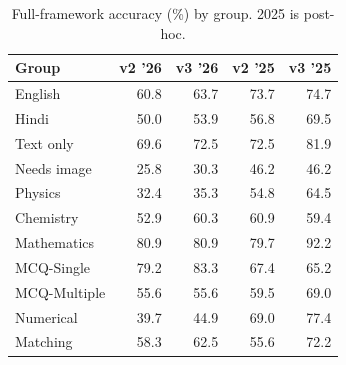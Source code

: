 \begin{table}[!t]
\centering
\footnotesize
\caption{Full-framework accuracy (\%) by group. 2025 is post-hoc.}
\label{tab:bd}
\setlength{\tabcolsep}{3.5pt}
\begin{tabular}{lrrrr}
\toprule
Group & v2 '26 & v3 '26 & v2 '25 & v3 '25 \\
\midrule
English & 60.8 & 63.7 & 73.7 & 74.7 \\
Hindi & 50.0 & 53.9 & 56.8 & 69.5 \\
Text only & 69.6 & 72.5 & 72.5 & 81.9 \\
Needs image & 25.8 & 30.3 & 46.2 & 46.2 \\
Physics & 32.4 & 35.3 & 54.8 & 64.5 \\
Chemistry & 52.9 & 60.3 & 60.9 & 59.4 \\
Mathematics & 80.9 & 80.9 & 79.7 & 92.2 \\
MCQ-Single & 79.2 & 83.3 & 67.4 & 65.2 \\
MCQ-Multiple & 55.6 & 55.6 & 59.5 & 69.0 \\
Numerical & 39.7 & 44.9 & 69.0 & 77.4 \\
Matching & 58.3 & 62.5 & 55.6 & 72.2 \\
\bottomrule
\end{tabular}
\end{table}
